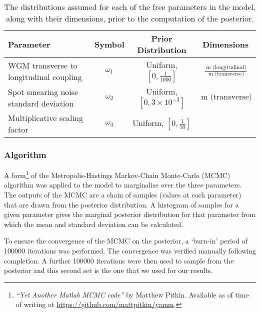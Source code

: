 \begin{table}
  \centering
  \begin{tabular}{|p{3cm}|c|c|c|}
    \hline
    \textbf{Parameter}   & \textbf{Symbol}     & \textbf{Prior Distribution} & \textbf{Dimensions} \\ \hline
    \gls{WGM} transverse to longitudinal coupling & $\omega_1$ & Uniform, $\left[ 0, \frac{1}{1000} \right]$ & $\frac{\SI{}{\meter} \text{ (longitudinal)}}{\SI{}{\meter} \text{ (transverse)}}$ \\ \hline
    Spot smearing noise standard deviation & $\omega_2$ & Uniform, $\left[ 0, 3 \times 10^{-3} \right]$ & $\SI{}{\meter} \text{ (transverse)}$ \\ \hline
    Multiplicative scaling factor                    & $\omega_3$ & Uniform, $\left[ 0, \frac{1}{10} \right]$ &  \\ \hline
  \end{tabular}
  \caption[Distributions assumed for each of the free parameters in the waveguide model]{\label{tab:priors}The distributions assumed for each of the free parameters in the model, along with their dimensions, prior to the computation of the posterior.}
\end{table}

\subsubsection{Algorithm}
A form\footnote{\emph{``Yet Another Matlab MCMC code''} by Matthew Pitkin. Available as of time of writing at \url{https://github.com/mattpitkin/yamm}.} of the Metropolis-Hastings Markov-Chain Monte-Carlo (MCMC) algorithm \cite{Hastings1970} was applied to the model to marginalise over the three parameters. The outputs of the MCMC are a chain of samples (values at each parameter) that are drawn from the posterior distribution. A histogram of samples for a given parameter gives the marginal posterior distribution for that parameter from which the mean and standard deviation can be calculated.

To ensure the convergence of the MCMC on the posterior, a `burn-in' period of \num{100000} iterations was performed. The convergence was verified manually following completion. A further \num{100000} iterations were then used to sample from the posterior and this second set is the one that we used for our results.

